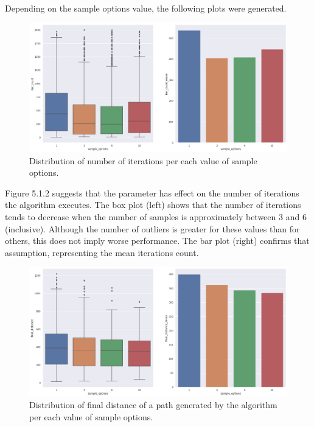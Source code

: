 \documentclass[12pt]{article}
\DeclareRobustCommand{\[}{\begin{equation}}
\DeclareRobustCommand{\]}{\end{equation}}
\numberwithin{equation}{section}
\begin{document}
Depending on the sample options value, the following plots were generated.

\begin{figure}[H]
\begin{center}
\includegraphics[scale=0.4]{images/so_iter_count.png}
\captionsetup{width=0.6\textwidth}
\caption{Distribution of number of iterations per each value of sample options.}
\end{center}
\end{figure}

Figure 5.1.2 suggests that the parameter has effect on the number of iterations the algorithm executes. The box plot (left) shows that the number of iterations tends to decrease when the number of samples is approximately between 3 and 6 (inclusive). Although the number of outliers is greater for these values than for others, this does not imply worse performance. The bar plot (right) confirms that assumption, representing the mean iterations count.

\begin{figure}[H]
\begin{center}
\includegraphics[scale=0.4]{images/so_final_distance.png}
\captionsetup{width=0.6\textwidth}
\caption{Distribution of final distance of a path generated by the algorithm per each value of sample options.}
\end{center}
\end{figure}
\end{document}
